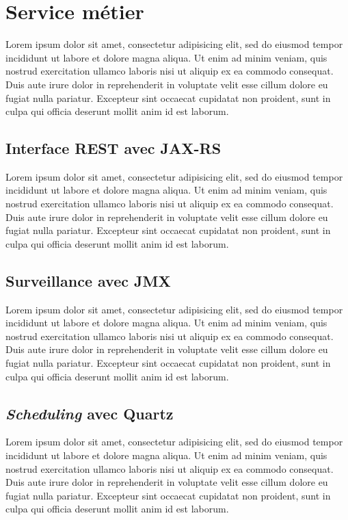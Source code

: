 \documentclass{article}
\begin{document}

\section{Service métier} %
\label{sec:service_metier}
Lorem ipsum dolor sit amet, consectetur adipisicing elit, sed do eiusmod tempor incididunt ut labore et dolore magna aliqua. Ut enim ad minim veniam, quis nostrud exercitation ullamco laboris nisi ut aliquip ex ea commodo consequat. Duis aute irure dolor in reprehenderit in voluptate velit esse cillum dolore eu fugiat nulla pariatur. Excepteur sint occaecat cupidatat non proident, sunt in culpa qui officia deserunt mollit anim id est laborum.

\subsection{Interface REST avec JAX-RS} %
\label{sub:interface_rest}
Lorem ipsum dolor sit amet, consectetur adipisicing elit, sed do eiusmod tempor incididunt ut labore et dolore magna aliqua. Ut enim ad minim veniam, quis nostrud exercitation ullamco laboris nisi ut aliquip ex ea commodo consequat. Duis aute irure dolor in reprehenderit in voluptate velit esse cillum dolore eu fugiat nulla pariatur. Excepteur sint occaecat cupidatat non proident, sunt in culpa qui officia deserunt mollit anim id est laborum.

\subsection{Surveillance avec JMX} %
\label{sub:surveillance_jmx}
Lorem ipsum dolor sit amet, consectetur adipisicing elit, sed do eiusmod tempor incididunt ut labore et dolore magna aliqua. Ut enim ad minim veniam, quis nostrud exercitation ullamco laboris nisi ut aliquip ex ea commodo consequat. Duis aute irure dolor in reprehenderit in voluptate velit esse cillum dolore eu fugiat nulla pariatur. Excepteur sint occaecat cupidatat non proident, sunt in culpa qui officia deserunt mollit anim id est laborum.

\subsection{\emph{Scheduling} avec Quartz} %
\label{sub:scheduling_avec_quartz}
Lorem ipsum dolor sit amet, consectetur adipisicing elit, sed do eiusmod tempor incididunt ut labore et dolore magna aliqua. Ut enim ad minim veniam, quis nostrud exercitation ullamco laboris nisi ut aliquip ex ea commodo consequat. Duis aute irure dolor in reprehenderit in voluptate velit esse cillum dolore eu fugiat nulla pariatur. Excepteur sint occaecat cupidatat non proident, sunt in culpa qui officia deserunt mollit anim id est laborum.
\end{document}

